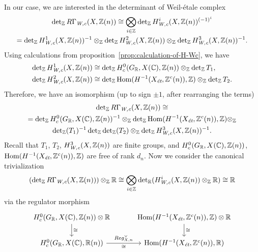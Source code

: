\documentclass{article}
\numberwithin{equation}{section}
\begin{document}
In our case, we are interested in the determinant of Weil-étale complex
\begin{multline*}
  \det_\ZZ R\Gamma_\Wc (X, \ZZ(n)) \cong
  \bigotimes_{i \in \ZZ} \det_\ZZ H^i_\Wc (X, \ZZ(n))^{(-1)^i} \\
  =
  \det_\ZZ H^1_\Wc (X, \ZZ(n))^{-1} \otimes_\ZZ
  \det_\ZZ H^2_\Wc (X, \ZZ(n)) \otimes_\ZZ
  \det_\ZZ H^3_\Wc (X, \ZZ(n))^{-1}.
\end{multline*}
Using calculations from proposition~\ref{prop:calculation-of-H-Wc}, we have
\begin{align*}
  \det_\ZZ H^1_\Wc (X, \ZZ(n)) & \cong \det_\ZZ H^0_c (G_\RR, X (\CC), \ZZ(n)) \otimes_\ZZ \det_\ZZ T_1, \\
  \det_\ZZ H^2_\Wc (X, \ZZ(n)) & \cong \det_\ZZ \Hom (H^{-1} (X_\et, \ZZ^c(n)), \ZZ) \otimes_\ZZ \det_\ZZ T_2.
\end{align*}
Therefore, we have an isomorphism (up to sign $\pm 1$, after rearranging the
terms)
\begin{multline*}
  \det_\ZZ R\Gamma_\Wc (X, \ZZ(n)) \cong \\
  =
  \det_\ZZ H^0_c (G_\RR, X (\CC), \ZZ(n))^{-1} \otimes_\ZZ
  \det_\ZZ \Hom (H^{-1} (X_\et, \ZZ^c(n)), \ZZ) \otimes_\ZZ \\
  \det_\ZZ (T_1)^{-1} \det_\ZZ  \det_\ZZ (T_2) \otimes_\ZZ \det_\ZZ H^3_\Wc (X, \ZZ(n))^{-1}.
\end{multline*}
Recall that $T_1$, $T_2$, $H^3_\Wc (X, \ZZ(n))$ are finite groups, and
$H^0_c (G_\RR, X (\CC), \ZZ(n))$, $\Hom (H^{-1} (X_\et, \ZZ^c(n)), \ZZ)$
are free of rank $d_n$. Now we consider the canonical trivialization
\[ (\det_\ZZ R\Gamma_\Wc (X, \ZZ(n))) \otimes_\ZZ \RR \cong
  \bigotimes_{i\in \ZZ} \det_\RR (H^i_\Wc (X, \ZZ(n))\otimes_\ZZ \RR)
  \cong \RR \]
via the regulator morphism
\[ \begin{tikzcd}[column sep=3em]
    H^0_c (G_\RR, X (\CC), \ZZ(n)) \otimes \RR\ar{d}{\cong} & \Hom (H^{-1} (X_\et, \ZZ^c (n)), \ZZ) \otimes \RR\ar{d}{\cong} \\
    H^0_c (G_\RR, X (\CC), \RR (n)) \ar{r}{Reg^\vee_{X,n}}[swap]{\cong} & \Hom (H^{-1} (X_\et, \ZZ^c (n)), \RR)
  \end{tikzcd} \]
\end{document}
